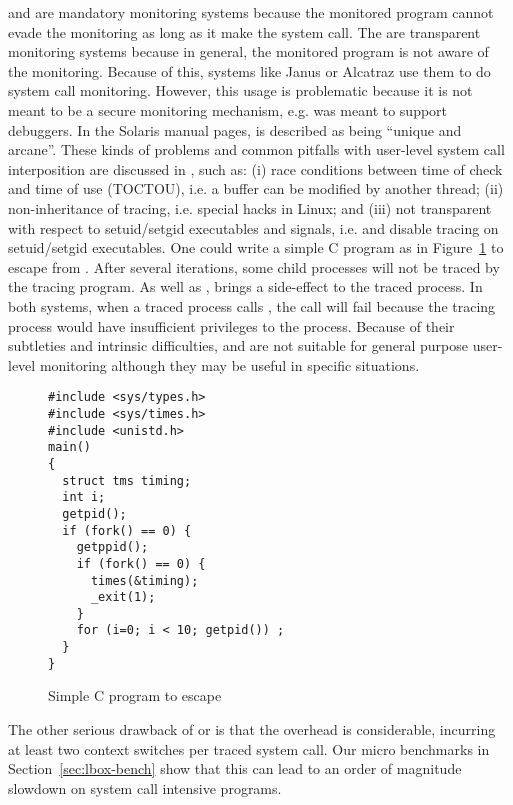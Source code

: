  and  are mandatory monitoring
systems because the monitored program cannot evade the monitoring as long
as it make the system call.
The are transparent monitoring systems because in general,
the monitored program is not aware of the monitoring.
Because of this,
systems like Janus \cite{wagner1999janus} or
Alcatraz \cite{liang2009alcatraz} use them to do system call monitoring.
However, this usage is problematic because it is not
meant to be a secure monitoring mechanism, e.g.
 was meant to support debuggers.
In the Solaris manual pages,  is described as being
``unique and arcane''.
These kinds of problems and common
pitfalls with user-level system call interposition
are discussed in \cite{garfinkel2003traps}, such as:
(i) race conditions between time of check and time of use (TOCTOU), 
i.e. a buffer can be modified by another thread;
(ii) non-inheritance of tracing, i.e. special  hacks in Linux;
and (iii) not transparent with respect to setuid/setgid executables 
and signals,
i.e.  and  disable tracing 
on setuid/setgid executables.  
One could write a simple C program as in Figure~\ref{fig:ptrace-bug}
to escape from .
After several iterations, some
child processes will not be traced by the tracing program.
As well as , 
brings a side-effect to the traced process.
In both systems, when a traced process calls ,
the call will fail because the tracing process would have insufficient
privileges to the  process.
Because of their subtleties and intrinsic difficulties,
 and  are not suitable for general purpose user-level
monitoring although they may be useful in specific situations.

\begin{figure}[htb]
\begin{verbatim}
#include <sys/types.h>
#include <sys/times.h>
#include <unistd.h>
main()
{
  struct tms timing;
  int i;
  getpid();
  if (fork() == 0) {
    getppid();
    if (fork() == 0) {
      times(&timing);
      _exit(1);
    }
    for (i=0; i < 10; getpid()) ;
  }
}
\end{verbatim}
\caption{Simple C program to escape }
\label{fig:ptrace-bug}
\end{figure}

The other serious drawback of  or  is that
the overhead is considerable, incurring at least two
context switches per traced system call.
Our micro benchmarks in Section~\ref{sec:lbox-bench} show that
this can lead to an order of magnitude
slowdown on system call intensive programs.

